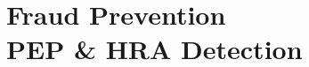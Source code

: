 \documentclass[a4paper, oneside]{csthesis}
\begin{document}









\chapter{Fraud Prevention \\PEP \& HRA Detection}
\end{document}
